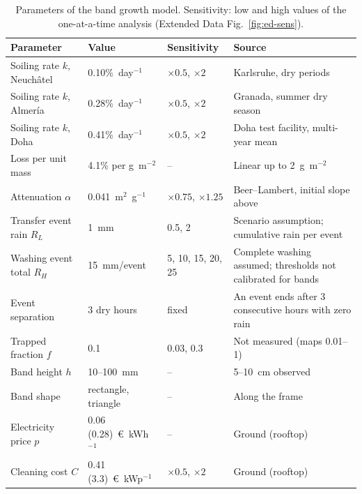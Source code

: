 \begin{table}[!t]
\caption{Parameters of the band growth model. Sensitivity: low and high values of the one-at-a-time analysis (Extended Data Fig.~\ref{fig:ed-sens}).\label{tab:bandparams}}
\begin{tabularx}{\textwidth}{p{3.6cm}p{3.0cm}p{2.3cm}X}
\toprule
\textbf{Parameter} & \textbf{Value} & \textbf{Sensitivity} & \textbf{Source} \\
\midrule
\rowcolor{tabgrey} Soiling rate $k$, Neuch\^atel & 0.10\%~day$^{-1}$ & $\times 0.5$, $\times 2$ & Karlsruhe, dry periods \cite{WorldEnergyMeteorology} \\
Soiling rate $k$, Almer\'ia & 0.28\%~day$^{-1}$ & $\times 0.5$, $\times 2$ & Granada, summer dry season \cite{micheliEconomicsSeasonalPhotovoltaic2021} \\
\rowcolor{tabgrey} Soiling rate $k$, Doha & 0.41\%~day$^{-1}$ & $\times 0.5$, $\times 2$ & Doha test facility, multi-year mean \cite{ahziInvestigationPVSoiling} \\
Loss per unit mass & 4.1\% per g~m$^{-2}$ & -- & Linear up to 2~g~m$^{-2}$ \cite{boyleNaturalSoilingPhotovoltaic2015} \\
\rowcolor{tabgrey} Attenuation $\alpha$ & 0.041~m$^{2}$~g$^{-1}$ & $\times 0.75$, $\times 1.25$ & Beer--Lambert, initial slope above \\
Transfer event rain $R_L$ & 1~mm & 0.5, 2 & Scenario assumption; cumulative rain per event \\
\rowcolor{tabgrey} Washing event total $R_H$ & 15~mm/event & 5, 10, 15, 20, 25 & Complete washing assumed; thresholds not calibrated for bands \\
Event separation & 3 dry hours & fixed & An event ends after 3 consecutive hours with zero rain \\
\rowcolor{tabgrey} Trapped fraction $f$ & 0.1 & 0.03, 0.3 & Not measured (maps 0.01--1) \\
Band height $h$ & 10--100~mm & -- & 5--10~cm observed \cite{yanYao2018} \\
\rowcolor{tabgrey} Band shape & rectangle, triangle & -- & Along the frame \cite{cuiCharacterizationSoilingBands2021a} \\
Electricity price $p$ & 0.06 (0.28)~\euro~kWh$^{-1}$ & -- & Ground (rooftop) \cite{ilseTechnoEconomicAssessmentSoiling2019a} \\
\rowcolor{tabgrey} Cleaning cost $C$ & 0.41 (3.3)~\euro~kWp$^{-1}$ & $\times 0.5$, $\times 2$ & Ground (rooftop) \cite{ilseTechnoEconomicAssessmentSoiling2019a} \\

\end{tabularx}
\end{table}
